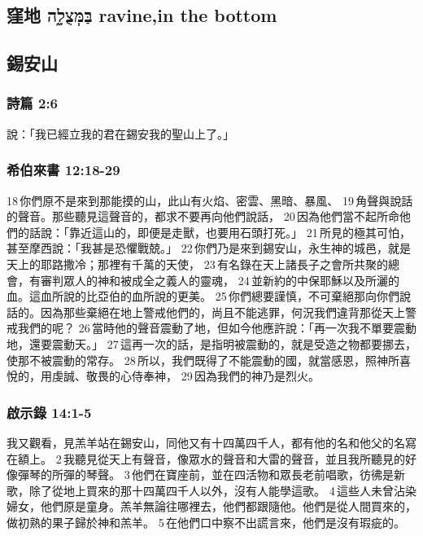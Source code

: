 \subsection{窪地  בַּמְּצֻלָ֑ה  ravine,in the bottom}











\subsection{錫安山}
\subsubsection{詩篇 2:6}
說：「我已經立我的君在錫安我的聖山上了。」
\subsubsection{希伯來書 12:18-29}
18 你們原不是來到那能摸的山，此山有火焰、密雲、黑暗、暴風、 19 角聲與說話的聲音。那些聽見這聲音的，都求不要再向他們說話， 20 因為他們當不起所命他們的話說：「靠近這山的，即便是走獸，也要用石頭打死。」 21 所見的極其可怕，甚至摩西說：「我甚是恐懼戰兢。」 22 你們乃是來到錫安山，永生神的城邑，就是天上的耶路撒冷；那裡有千萬的天使， 23 有名錄在天上諸長子之會所共聚的總會，有審判眾人的神和被成全之義人的靈魂， 24 並新約的中保耶穌以及所灑的血。這血所說的比亞伯的血所說的更美。 25 你們總要謹慎，不可棄絕那向你們說話的。因為那些棄絕在地上警戒他們的，尚且不能逃罪，何況我們違背那從天上警戒我們的呢？ 26 當時他的聲音震動了地，但如今他應許說：「再一次我不單要震動地，還要震動天。」 27 這再一次的話，是指明被震動的，就是受造之物都要挪去，使那不被震動的常存。 28 所以，我們既得了不能震動的國，就當感恩，照神所喜悅的，用虔誠、敬畏的心侍奉神， 29 因為我們的神乃是烈火。
\subsubsection{啟示錄 14:1-5 }
我又觀看，見羔羊站在錫安山，同他又有十四萬四千人，都有他的名和他父的名寫在額上。 2 我聽見從天上有聲音，像眾水的聲音和大雷的聲音，並且我所聽見的好像彈琴的所彈的琴聲。 3 他們在寶座前，並在四活物和眾長老前唱歌，彷彿是新歌，除了從地上買來的那十四萬四千人以外，沒有人能學這歌。 4 這些人未曾沾染婦女，他們原是童身。羔羊無論往哪裡去，他們都跟隨他。他們是從人間買來的，做初熟的果子歸於神和羔羊。 5 在他們口中察不出謊言來，他們是沒有瑕疵的。





